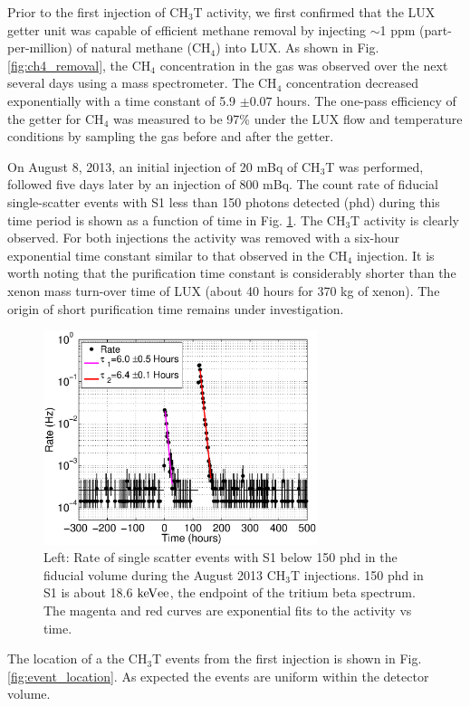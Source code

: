 Prior to the first injection of CH$_3$T activity, we first confirmed that the LUX getter unit was capable of efficient methane removal by injecting  $\sim$1 ppm (part-per-million) of natural methane (CH$_4$) into LUX. As shown in Fig. \ref{fig:ch4_removal}, the CH$_4$ concentration in the gas was observed over the next several days using a mass spectrometer. The CH$_4$ concentration decreased exponentially with a time constant of 5.9 $\pm 0.07$ hours. The one-pass efficiency of the getter for CH$_4$ was measured to be 97\% under the LUX flow and temperature conditions by sampling the gas before and after the getter. 

On August 8, 2013, an initial injection of 20 mBq of CH$_3$T was performed, followed five days later by an injection of 800 mBq. The count rate of fiducial single-scatter events with S1 less than 150 photons detected (phd) during this time period is shown as a function of time in Fig. \ref{fig:ch3t_removal}. The CH$_3$T activity is clearly observed. For both injections the activity was removed with a six-hour exponential time constant similar to that observed in the CH$_4$ injection. It is worth noting that the purification time constant is considerably shorter than the xenon mass turn-over time of LUX (about 40 hours for 370 kg of xenon).  The origin of short purification time remains under investigation.

\begin{figure}[h!]\centering
\includegraphics[width=80mm]{fig/CH3T_Rate_fid_150_Run03_Tritium_Rate.eps}
\caption{Left: Rate of single scatter events with S1 below 150 phd in the fiducial volume during the August 2013 CH$_3$T injections. 150 phd in S1 is about 18.6 $\rm keV{ee}$, the endpoint of the tritium beta spectrum. The magenta and red curves are exponential fits to the activity vs time.}
\label{fig:ch3t_removal}
\end{figure}

The location of a the CH$_3$T events from the first injection is shown in Fig. \ref{fig:event_location}. As expected the events are uniform within the detector volume.
 
